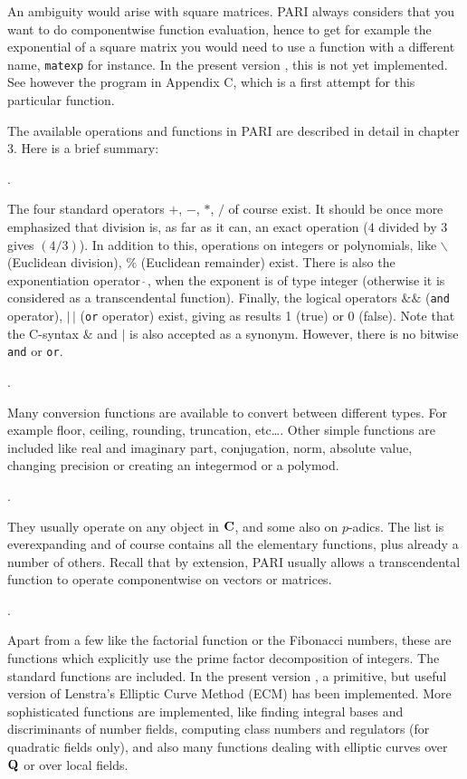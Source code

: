 An ambiguity would arise with square matrices. PARI always considers
that you want to do componentwise function evaluation, hence to get
for example the exponential of a square matrix you would need to use
a function with a different name, {\tt matexp} for instance. In the present
version \vers, this is not yet implemented. See however the program in
Appendix C, which is a first attempt for this particular function.

The available operations and functions in PARI are described in detail
in chapter 3. Here is a brief summary:

.

The four standard operators $+$, $-$, $*$, $/$ of course exist. It should
be once more emphasized that division is, as far as it can, an exact
operation ($4$ divided by $3$ gives $(4/3)$). In addition to this, operations
on integers or polynomials, like $\backslash $ (Euclidean division),
$\%$ (Euclidean remainder) exist. There is also the exponentiation
operator $\hat{\ }$, when the exponent is of type integer
(otherwise it is considered as a transcendental function).
Finally, the logical operators $\&\&$ ({\tt and} operator), $|\,|$ ({\tt or}
operator) exist, giving as results 1 (true) or 0 (false). Note that the
C-syntax $\&$ and $|$ is also accepted as a synonym. However, there is
no bitwise {\tt and} or {\tt or}.

.

Many conversion functions are available to convert between different
types. For example floor, ceiling, rounding, truncation, etc\dots.
Other simple functions are included like real and imaginary part,
conjugation,
norm, absolute value, changing precision or creating an integermod or a
polymod.

.

They usually operate on any object in $\Bbb C$, and some also on $p$-adics.
The list is everexpanding and of course contains all the elementary
functions, plus already a number of others. Recall that by extension,
PARI usually allows a transcendental function to operate componentwise
on vectors or matrices.

.

Apart from a few like the factorial function or the Fibonacci
numbers, these are functions which explicitly use the prime factor
decomposition of integers. The standard functions are included.
In the present version \vers, a primitive, but useful version of Lenstra's
Elliptic Curve Method (ECM) has been implemented.
More sophisticated functions are implemented, like finding integral bases
and discriminants of number fields, computing class numbers and regulators
(for quadratic fields only), and also many functions dealing with
elliptic curves over $\Bbb Q$ or over local fields.

